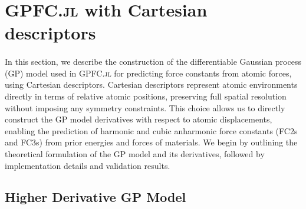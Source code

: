 

\section{\textsc{GPFC.jl} with Cartesian descriptors} \label{sec:3.1}
\paragraph{}
In this section, we describe the construction of the differentiable Gaussian process (GP) model used in \textsc{GPFC.jl} for predicting force constants from atomic forces, using Cartesian descriptors.
Cartesian descriptors represent atomic environments directly in terms of relative atomic positions, preserving full spatial resolution without imposing any symmetry constraints.
This choice allows us to directly construct the GP model derivatives with respect to atomic displacements, enabling the prediction of harmonic and cubic anharmonic force constants (FC2s and FC3s) from prior energies and forces of materials.
We begin by outlining the theoretical formulation of the GP model and its derivatives, followed by implementation details and validation results.

\subsection{Higher Derivative GP Model} \label{subsec:3.1.1}

